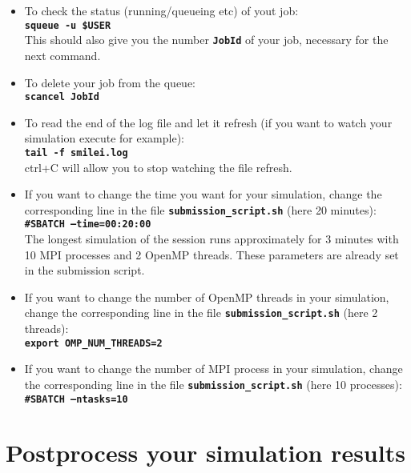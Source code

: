 \documentclass{article}
\newcommand{\commandline}[1]{\texttt{\textbf{#1}}}
\begin{document}
\begin{itemize}
\item To check the status (running/queueing etc) of yout job:\\
\commandline{squeue -u \$USER}\\
This should also give you the number \commandline{JobId} of your job, necessary for the next command.

\item To delete your job from the queue:\\
\commandline{scancel JobId}

\item To read the end of the log file and let it refresh (if you want to watch your simulation execute for example):\\
\commandline{tail -f smilei.log}\\
ctrl+C will allow you to stop watching the file refresh.

\item If you want to change the time you want for your simulation, change the corresponding line in the file \commandline{submission\_script.sh} (here 20 minutes):\\
\commandline{\#SBATCH --time=00:20:00}\\
The longest simulation of the session runs approximately for 3 minutes with 10 MPI processes and 2 OpenMP threads. These parameters are already set in the submission script.

\item If you want to change the number of OpenMP threads in your simulation, change the corresponding line in the file \commandline{submission\_script.sh} (here 2 threads):\\
\commandline{export OMP\_NUM\_THREADS=2}

\item If you want to change the number of MPI process in your simulation, change the corresponding line in the file \commandline{submission\_script.sh} (here 10 processes):\\
\commandline{\#SBATCH --ntasks=10}

\end{itemize}


\section{Postprocess your simulation results}
\end{document}
